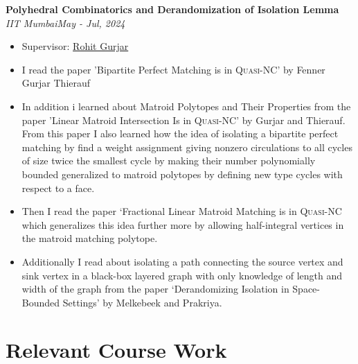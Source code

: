 \documentclass[letterpaper,10pt]{article}
\newcommand{\sbt}{\,\begin{picture}(-1,1)(-1,-3)\circle*{3}\end{picture}\ }
\newcommand{\heading}[2]{
  \hspace{10pt}#1\hfill#2\\
}
\newcommand{\headingBf}[2]{
  \heading{\textbf{#1}}{\textbf{#2}}
}
\newcommand{\headingIt}[2]{
  \heading{\textit{#1}}{\textit{#2}}
}
\newenvironment{resume_list}{
  \vspace{-7pt}
  \begin{itemize}[itemsep=-2px, parsep=1pt, leftmargin=30pt]
}{
  \end{itemize}
}
\begin{document}
\begin{resume_list}
\item \headingBf{Polyhedral Combinatorics and Derandomization of Isolation Lemma}{}
\headingIt{IIT Mumbai}{May - Jul, 2024}
\begin{itemize}[label=$\sbt$]
	\item Supervisor: \href{https://www.cse.iitb.ac.in/~rgurjar/}{Rohit Gurjar}
	\item I read the paper 'Bipartite Perfect Matching is in \textsc{Quasi-NC}' by Fenner Gurjar Thierauf
	\item In addition i learned about Matroid Polytopes and Their Properties from the paper 'Linear Matroid Intersection Is in \textsc{Quasi-NC}' by Gurjar and Thierauf. From this paper I also learned how the idea of isolating a bipartite perfect matching by find a weight assignment giving nonzero circulations to all cycles  of size twice the smallest cycle by making their number polynomially bounded generalized to matroid polytopes by defining new type cycles with respect to a face.
	\item Then I read the paper `Fractional Linear Matroid Matching is in \textsc{Quasi-NC} which generalizes this idea further more by allowing half-integral vertices in the matroid matching polytope.
	\item Additionally I read about isolating a path connecting the source vertex and sink vertex in a black-box layered graph with only knowledge of length and width of the graph from the paper `Derandomizing Isolation in Space-Bounded Settings' by Melkebeek and Prakriya.
\end{itemize}

\end{resume_list}

\section{Relevant Course Work}
\end{document}
